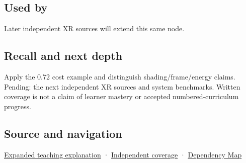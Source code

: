 \subsection{Used by}\label{appendix-5878b813b732-used-by}

\hypertarget{appendix-5878b813b732-used-by}{}

Later independent XR sources will extend this same node.

\subsection{Recall and next depth}\label{appendix-5878b813b732-recall-and-next-depth}

\hypertarget{appendix-5878b813b732-recall-and-next-depth}{}

Apply the 0.72 cost example and distinguish shading/frame/energy claims. Pending: the next independent XR sources and system benchmarks. Written coverage is not a claim of learner mastery or accepted numbered-curriculum progress.

\subsection{Source and navigation}\label{appendix-5878b813b732-source-and-navigation}

\hypertarget{appendix-5878b813b732-source-and-navigation}{}

\hyperref[04-visual-computing-ii-ch042-foveation-is-allocation-under-uncertain-perception-and-timing]{Expanded teaching explanation} · \hyperref[appendix-fd090d982a15-xr01---independent-seeing-and-representation-source]{Independent coverage} · \hyperref[appendix-4ad47bdd269a]{Dependency Map}
